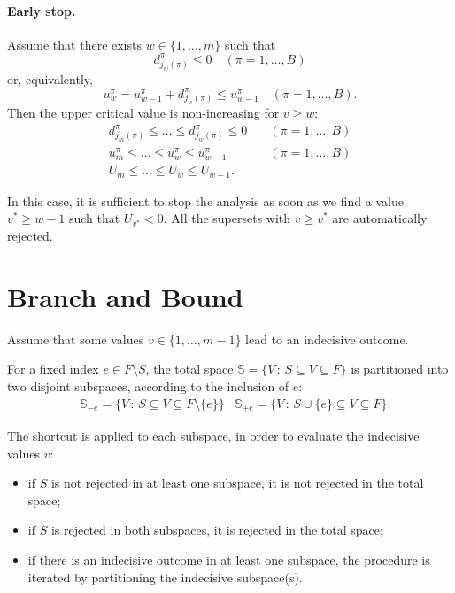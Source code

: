 \documentclass[11pt,a4paper,openright,twoside]{article}
\begin{document}
\paragraph{Early stop.} Assume that there exists $w\in\{1,\ldots,m\}$ such that
\[d_{j_w(\pi)}^\pi\leq 0\quad (\pi=1,\ldots,B)\]
or, equivalently,
\[u_w^\pi =u_{w-1}^\pi +d_{j_w(\pi)}^\pi\leq u_{w-1}^\pi\quad (\pi=1,\ldots,B).\]
Then the upper critical value is non-increasing for $v\geq w$:
\begin{align*}
d_{j_m(\pi)}^\pi\leq \ldots \leq d_{j_w(\pi)}^\pi \leq 0&\quad(\pi=1,\ldots,B)\\
u_m^\pi \leq\ldots\leq u_w^\pi\leq u_{w-1}^\pi&\quad(\pi=1,\ldots,B)\\
U_m \leq\ldots\leq U_w\leq U_{w-1}. &
\end{align*}

In this case, it is sufficient to stop the analysis as soon as we find a value $v^*\geq w-1$ such that $U_{v^*}<0$. All the supersets with $v\geq v^*$ are automatically rejected.





\vspace{10mm}

\section{Branch and Bound}
Assume that some values $v\in\{1,\ldots,m-1\}$ lead to an indecisive outcome. 

For a fixed index $e\in F\setminus S$, the total space $\mathbb{S}=\{V\,:\,S\subseteq V\subseteq F\}$ is partitioned into two disjoint subspaces, according to the inclusion of $e$:
\begin{align*}
&\mathbb{S}_{-e}=\{V\,:\,S\subseteq V\subseteq F\setminus\{e\}\} & \mathbb{S}_{+e}=\{V\,:\,S\cup\{e\}\subseteq V\subseteq F\}.
\end{align*}

The shortcut is applied to each subspace, in order to evaluate the indecisive values $v$:
\begin{itemize}
\item if $S$ is not rejected in at least one subspace, it is not rejected in the total space;
\item if $S$ is rejected in both subspaces, it is rejected in the total space;
\item if there is an indecisive outcome in at least one subspace, the procedure is iterated by partitioning the indecisive subspace(s).
\end{itemize}
\end{document}
